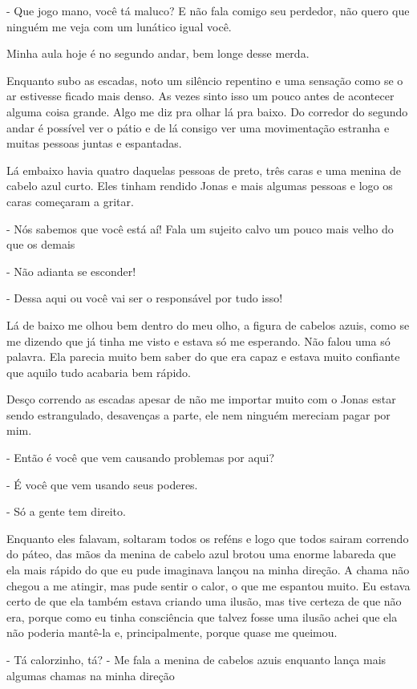 - Que jogo mano, você tá maluco? E não fala comigo seu perdedor, não quero que ninguém me veja com um lunático igual você.

Minha aula hoje é no segundo andar, bem longe desse merda.

Enquanto subo as escadas, noto um silêncio repentino e uma sensação como se o ar estivesse ficado mais denso. As vezes sinto isso um pouco antes de acontecer alguma coisa grande. Algo me diz pra olhar lá pra baixo. Do corredor do segundo andar é possível ver o pátio e de lá consigo ver uma movimentação estranha e muitas pessoas juntas e espantadas.

Lá embaixo havia quatro daquelas pessoas de preto, três caras e uma menina de cabelo azul curto. Eles tinham rendido Jonas e mais algumas pessoas e logo os caras começaram a gritar.

- Nós sabemos que você está aí! Fala um sujeito calvo um pouco mais velho do que os demais

- Não adianta se esconder!

- Dessa aqui ou você vai ser o responsável por tudo isso!

Lá de baixo me olhou bem dentro do meu olho, a figura de cabelos azuis, como se me dizendo que já tinha me visto e estava só me esperando. Não falou uma só palavra. Ela parecia muito bem saber do que era capaz e estava muito confiante que aquilo tudo acabaria bem rápido.

Desço correndo as escadas apesar de não me importar muito com o Jonas estar sendo estrangulado, desavenças a parte, ele nem ninguém mereciam pagar por mim.

- Então é você que vem causando problemas por aqui?

- É você que vem usando seus poderes.

- Só a gente tem direito.

Enquanto eles falavam, soltaram todos os reféns e logo que todos sairam correndo do páteo, das mãos da menina de cabelo azul brotou uma enorme labareda que ela mais rápido do que eu pude imaginava lançou na minha direção. A chama não chegou a me atingir, mas pude sentir o calor, o que me espantou muito. Eu estava certo de que ela também estava criando uma ilusão, mas tive certeza de que não era, porque como eu tinha consciência que talvez fosse uma ilusão achei que ela não poderia mantê-la e, principalmente, porque quase me queimou.

- Tá calorzinho, tá? - Me fala a menina de cabelos azuis enquanto lança mais algumas chamas na minha direção

